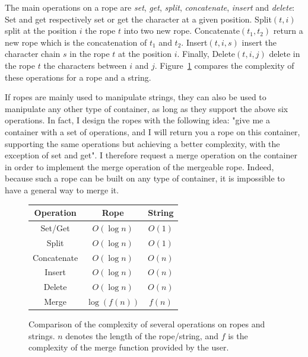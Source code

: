 \documentclass{article}
\begin{document}
The main operations on a rope are \emph{set}, \emph{get}, \emph{split}, \emph{concatenate}, \emph{insert} and \emph{delete}:
Set and get respectively set or get the character at a given position.
Split$(t, i)$ split at the position $i$ the rope $t$ into two new rope.
Concatenate$(t_1, t_2)$ return a new rope which is the concatenation of $t_1$ and $t_2$.
Insert$(t, i, s)$ insert the character chain $s$ in the rope $t$ at the position $i$.
Finally, Delete$(t, i, j)$ delete in the rope $t$ the characters between $i$ and $j$.
Figure~\ref{ropetable} compares the complexity of these operations for a rope and a string.

If ropes are mainly used to manipulate strings, they can also be used to manipulate any other type of container, as long as they support the above six operations.
In fact, I design the ropes with the following idea:
"give me a container with a set of operations, and I will return you a rope on this container, supporting the same operations but achieving a better complexity, with the exception of set and get".
I therefore request a merge operation on the container in order to implement the merge operation of the mergeable rope.
Indeed, because such a rope can be built on any type of container, it is impossible to have a general way to merge it.

\begin{figure}[hbt]
\centering
\setlength{\tabcolsep}{1cm}
\begin{tabular}{|c|c|c|}
\hline
	Operation &
	Rope &
	String \\
\hline
	Set/Get &
	\cellcolor{butter!20} $O(\log n)$ &
	\cellcolor{chameleon!20} $O(1)$ \\
\hline
	Split &
	\cellcolor{butter!20} $O(\log n)$ &
	\cellcolor{chameleon!20} $O(1)$ \\
\hline
	Concatenate &
	\cellcolor{butter!20} $O(\log n)$ &
	\cellcolor{scarletred!20} $O(n)$ \\
\hline
	Insert &
	\cellcolor{butter!20} $O(\log n)$ &
	\cellcolor{scarletred!20} $O(n)$ \\
\hline
	Delete &
	\cellcolor{butter!20} $O(\log n)$ &
	\cellcolor{scarletred!20} $O(n)$ \\
\hline
\hline
	Merge &
	\cellcolor{chameleon!20} $\log\left(f(n)\right)$ &
	\cellcolor{butter!20} $f(n)$ \\
\hline
\end{tabular}
\caption{Comparison of the complexity of several operations on ropes and strings. $n$ denotes the length of the rope/string, and $f$ is the complexity of the merge function provided by the user.}
\label{ropetable}
\end{figure}
\end{document}

